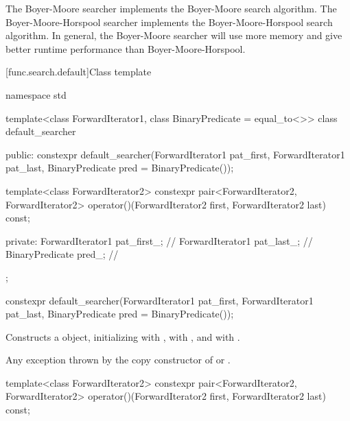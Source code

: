 \pnum
The Boyer-Moore searcher implements the Boyer-Moore search algorithm.
The Boyer-Moore-Horspool searcher implements the Boyer-Moore-Horspool search algorithm.
In general, the Boyer-Moore searcher will use more memory and give better runtime performance than Boyer-Moore-Horspool.

[func.search.default]{Class template }

%
\begin{codeblock}
namespace std {
  template<class ForwardIterator1, class BinaryPredicate = equal_to<>>
  class default_searcher {
  public:
    constexpr default_searcher(ForwardIterator1 pat_first, ForwardIterator1 pat_last,
                               BinaryPredicate pred = BinaryPredicate());

    template<class ForwardIterator2>
      constexpr pair<ForwardIterator2, ForwardIterator2>
        operator()(ForwardIterator2 first, ForwardIterator2 last) const;

  private:
    ForwardIterator1 pat_first_;        // \expos
    ForwardIterator1 pat_last_;         // \expos
    BinaryPredicate pred_;              // \expos
  };
}
\end{codeblock}

%
\begin{itemdecl}
constexpr default_searcher(ForwardIterator1 pat_first, ForwardIterator1 pat_last,
                           BinaryPredicate pred = BinaryPredicate());
\end{itemdecl}

\begin{itemdescr}
\pnum
\effects
Constructs a  object, initializing 
with , \mbox{} with , and
 with .

\pnum
\throws
Any exception thrown by the copy constructor of  or
.
\end{itemdescr}

%
\begin{itemdecl}
template<class ForwardIterator2>
  constexpr pair<ForwardIterator2, ForwardIterator2>
    operator()(ForwardIterator2 first, ForwardIterator2 last) const;
\end{itemdecl}

